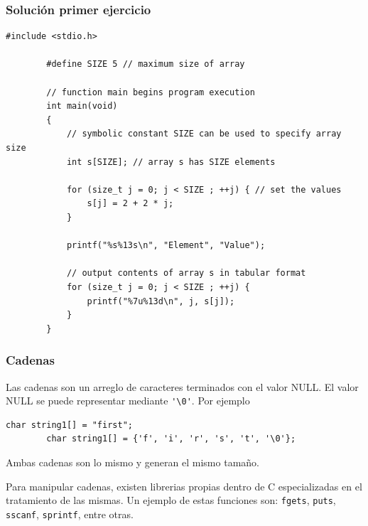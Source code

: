 \documentclass[10.5pt,scale=1.0,t,aspectratio=169,hyperref={pdfpagelabels=false}]{beamer}
\begin{document}
\begin{frame}[fragile]
	\frametitle{Solución primer ejercicio} 
	\begin{lstlisting}[style=CStyle]
		#include <stdio.h>
		
		#define SIZE 5 // maximum size of array
		
		// function main begins program execution
		int main(void)
		{
			// symbolic constant SIZE can be used to specify array size
			int s[SIZE]; // array s has SIZE elements
			
			for (size_t j = 0; j < SIZE ; ++j) { // set the values
				s[j] = 2 + 2 * j;
			}
			
			printf("%s%13s\n", "Element", "Value");
			
			// output contents of array s in tabular format
			for (size_t j = 0; j < SIZE ; ++j) {
				printf("%7u%13d\n", j, s[j]);
			}
		}
	\end{lstlisting}
\end{frame}
\begin{frame}[fragile]
	\frametitle{Cadenas} 
	Las cadenas son un arreglo de caracteres terminados con el valor NULL. El valor NULL se puede representar mediante \verb*|'\0'|. Por ejemplo
	\begin{lstlisting}[style=CStyle]
		char string1[] = "first";
		char string1[] = {'f', 'i', 'r', 's', 't', '\0'};
	\end{lstlisting}
	Ambas cadenas son lo mismo y generan el mismo tamaño.
	
	Para manipular cadenas, existen librerias propias dentro de C especializadas en el tratamiento de las mismas. Un ejemplo de estas funciones son: \verb*|fgets|, \verb*|puts|, \verb*|sscanf|, \verb*|sprintf|, entre otras. 
\end{frame}
\end{document}
